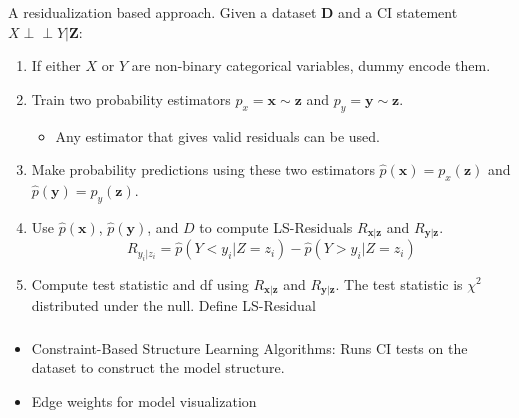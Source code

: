 \documentclass{beamer}
\def\ci{\perp\!\!\!\!\!\perp}
\begin{document}
\begin{frame}
	\frametitle{}
	A residualization based approach. Given a dataset $ \mathbf{D} $ and a CI statement $ X \ci Y | \bm{Z} $:
	\begin{enumerate}
		\item If either $ X $ or $ Y $ are non-binary categorical variables,
			dummy encode them.
		\item Train two probability estimators $ p_x = \bm{x} \sim \bm{z} $ and
			$ p_y = \bm{y} \sim \bm{z} $.
			\begin{itemize}
				\item Any estimator that gives valid residuals can be used.
			\end{itemize}
		\item Make probability predictions using these two estimators 
			$ \hat{p}(\bm{x}) = p_x(\bm{z}) $ and $ \hat{p}(\bm{y}) = p_y(\bm{\bm{z}}) $.
		\item Use $ \hat{p}(\bm{x}) $, $ \hat{p}(\bm{y}) $, and $ D $ to compute LS-Residuals $ R_{\bm{x}|\bm{z}} $ and $ R_{\bm{y}|\bm{z}} $.	
			$$ R_{y_i | z_i} = \hat{p}(Y < y_i | Z=z_i) - \hat{p}(Y>y_i|Z=z_i) $$
		\item Compute test statistic and df using $ R_{\bm{x}|\bm{z}} $ and $ R_{\bm{y}|\bm{z}} $. The test statistic is $ \chi^2 $ distributed under the null.
			Define LS-Residual
	\end{enumerate}
\end{frame}

\begin{frame}
	\frametitle{}
	\begin{itemize}
		\item Constraint-Based Structure Learning Algorithms: Runs CI tests on the dataset to construct the model structure.
		\item Edge weights for model visualization
	\end{itemize}
\end{frame}

\begin{frame}
	\frametitle{}
\end{frame}

\begin{frame}
	\frametitle{}
\end{frame}

\begin{frame}
	\frametitle{}
\end{frame}
\end{document}
